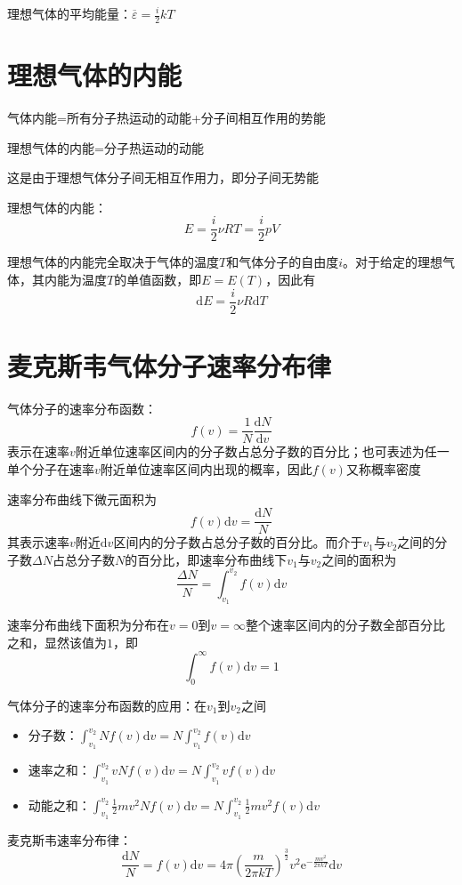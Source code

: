 \documentclass[12pt, a4paper, twoside]{ctexbook}
\begin{document}
{\sonti 理想气体的平均能量}：$\overline{\varepsilon}=\frac{i}{2}kT$
\section{理想气体的内能}
{\sonti 气体内能}=所有分子热运动的{\sonti 动能}+分子间相互作用的{\sonti 势能}

{\sonti 理想气体的内能}=分子热运动的{\sonti 动能}

这是由于理想气体分子间无相互作用力，即分子间无势能

{\sonti 理想气体的内能}：
$$
E=\frac{i}{2}\nu RT=\frac{i}{2}pV
$$

理想气体的内能完全取决于气体的温度$T$和气体分子的自由度$i$。对于给定的理想气体，其内能为温度$T$的单值函数，即$E=E\left(T\right)$，因此有
$$
\mathrm{d}E=\frac{i}{2}\nu R\mathrm{d}T
$$
\section{麦克斯韦气体分子速率分布律}
{\sonti 气体分子的速率分布函数}：
$$
f\left(v\right)=\frac{1}{N}\frac{\mathrm{d}N}{\mathrm{d}v}
$$
表示在速率$v$附近单位速率区间内的分子数占总分子数的百分比；也可表述为任一单个分子在速率$v$附近单位速率区间内出现的概率，因此$f\left(v\right)$又称概率密度

速率分布曲线下微元面积为
$$
f\left(v\right)\mathrm{d}v=\frac{\mathrm{d}N}{N}
$$
其表示速率$v$附近$\mathrm{d}v$区间内的分子数占总分子数的百分比。而介于$v_1$与$v_2$之间的分子数$\Delta N$占总分子数$N$的百分比，即速率分布曲线下$v_1$与$v_2$之间的面积为
$$
\frac{\Delta N}{N}=\int_{v_1}^{v_2}f\left(v\right)\mathrm{d}v
$$

速率分布曲线下面积为分布在$v=0$到$v=\infty$整个速率区间内的分子数全部百分比之和，显然该值为$1$，即
$$
\int_{0}^{\infty}f\left(v\right)\mathrm{d}v=1
$$

{\sonti 气体分子的速率分布函数的应用}：在$v_1$到$v_2$之间
\begin{itemize}
    \item 分子数：$\int_{v_1}^{v_2}Nf\left(v\right)\mathrm{d}v=N\int_{v_1}^{v_2}f\left(v\right)\mathrm{d}v$
    \item 速率之和：$\int_{v_1}^{v_2}vNf\left(v\right)\mathrm{d}v=N\int_{v_1}^{v_2}vf\left(v\right)\mathrm{d}v$
    \item 动能之和：$\int_{v_1}^{v_2}\frac{1}{2}mv^2Nf\left(v\right)\mathrm{d}v=N\int_{v_1}^{v_2}\frac{1}{2}mv^2f\left(v\right)\mathrm{d}v$
\end{itemize}

{\sonti 麦克斯韦速率分布律}：
$$
\frac{\mathrm{d}N}{N}=f\left(v\right)\mathrm{d}v=4\pi\left(\frac{m}{2\pi kT}\right)^{\frac{3}{2}}v^2\mathrm{e}^{-\frac{mv^2}{2\pi kT}}\mathrm{d}v
$$
\end{document}
